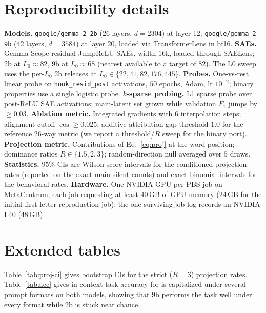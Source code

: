 \documentclass[11pt]{article}
\newcommand{\iscap}{\textsf{is-capitalized}}
\newcommand{\code}[1]{\texttt{#1}}
\theoremstyle{definition}
\begin{document}
\section{Reproducibility details}\label{app:repro}
\textbf{Models.} \code{google/gemma-2-2b} (26 layers, $d{=}2304$) at layer 12; \code{google/gemma-2-9b}
(42 layers, $d{=}3584$) at layer 20, loaded via TransformerLens in bf16.
\textbf{SAEs.} Gemma Scope residual JumpReLU SAEs, width $16$k, loaded through SAELens; 2b at $L_0\approx 82$,
9b at $L_0\approx 68$ (nearest available to a target of 82). The L0 sweep uses the per-$L_0$ 2b releases at
$L_0\in\{22,41,82,176,445\}$.
\textbf{Probes.} One-vs-rest linear probe on \code{hook\_resid\_post} activations, $50$ epochs, Adam,
lr $10^{-2}$; binary properties use a single logistic probe. \textbf{$k$-sparse probing.} L1 sparse probe
over post-ReLU SAE activations; main-latent set grown while validation $F_1$ jumps by $\ge 0.03$.
\textbf{Ablation metric.} Integrated gradients with $6$ interpolation steps; alignment cutoff $\cos\ge0.025$;
additive attribution-gap threshold $1.0$ for the reference 26-way metric (we report a threshold/$R$ sweep for
the binary port). \textbf{Projection metric.} Contributions of Eq.~\eqref{eq:proj} at the word position;
dominance ratios $R\in\{1.5,2,3\}$; random-direction null averaged over $5$ draws. \textbf{Statistics.}
$95\%$ CIs are Wilson score intervals for the conditioned projection rates (reported on the exact
main-silent counts) and exact binomial intervals for the behavioral rates. \textbf{Hardware.} One NVIDIA
GPU per PBS job on MetaCentrum, each job requesting at least 40\,GB of GPU memory (24\,GB for the initial first-letter reproduction job); the one surviving job log records an NVIDIA L40 (48\,GB).

\section{Extended tables}\label{app:extended}
Table~\ref{tab:proj-ci} gives bootstrap CIs for the strict ($R{=}3$) projection rates. Table~\ref{tab:acc}
gives in-context task accuracy for \iscap{} under several prompt formats on both models, showing that 9b
performs the task well under every format while 2b is stuck near chance.
\end{document}

